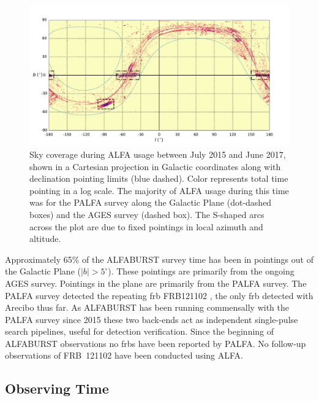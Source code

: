 \documentclass[a4paper,fleqn,usenatbib]{mnras}
\begin{document}
\begin{figure}
    \includegraphics[width=1.0\linewidth]{figures/cartview_sky_coverage.pdf}
    \caption{Sky coverage during ALFA usage between July 2015 and June 2017,
    shown in a Cartesian projection in Galactic coordinates along with
    declination pointing limits (blue dashed). Color represents total time
    pointing in a log scale. The majority of ALFA usage during this time was for
    the PALFA survey along the Galactic Plane (dot-dashed boxes) and the AGES
    survey (dashed box).  The S-shaped arcs across the plot are due to fixed
    pointings in local azimuth and altitude.
    }
    \label{fig:sky_coverage}
\end{figure}

Approximately 65\% of the ALFABURST survey time has been in pointings out of the
Galactic Plane ($|b| > 5^{\circ}$).  These pointings are primarily from the
ongoing AGES survey.  Pointings in the plane are primarily from the PALFA
survey.  The PALFA survey detected the repeating \gls{frb} FRB121102
\citep{2014ApJ...790..101S}, the only \gls{frb} detected with Arecibo thus far.
As ALFABURST has been running commensally with the PALFA survey since 2015 these
two back-ends act as independent single-pulse search pipelines, useful for
detection verification.  Since the beginning of ALFABURST observations no
\glspl{frb} have been reported by PALFA. No follow-up observations of FRB~121102
have been conducted using ALFA.



\subsection{Observing Time}
\label{sec:obs_time}
\end{document}
